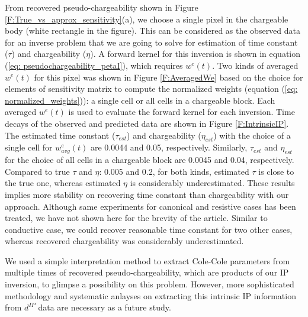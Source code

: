 \documentclass[a4paper, 11pt]{article}
\newcommand{\dip}{d^{IP}}
\begin{document}
From recovered pseudo-chargeability shown in Figure \ref{F:True_vs_approx_sensitivity}(a), we choose a single pixel in the chargeable body (white rectangle in the figure). 
This can be considered as the observed data for an inverse problem that we are going to solve for estimation of time constant ($\tau$) and chargeability ($\eta$). 
A forward kernel for this inversion is shown in equation (\ref{eq: pseudochargeability_petaI}), which requires $w^e(t)$. 
Two kinds of averaged $w^e(t)$ for this pixel was shown in Figure \ref{F:AveragedWe} based on the choice for elements of sensitivity matrix to compute the normalized weights (equation (\ref{eq: normalized_weights})): a single cell or all cells in a chargeable block. 
Each averaged $w^e(t)$ is used to evaluate the forward kernel for each inversion.
Time decays of the observed and predicted data are shown in Figure \ref{F:IntrinsicIP}.
The estimated time constant ($\tau_{est}$) and chargeability ($\eta_{est}$) with the choice of a single cell for $w^e_{avg}(t)$ are 0.0044 and 0.05, respectively. 
Similarly, $\tau_{est}$ and $\eta_{est}$ for the choice of all cells in a chargeable block are 0.0045 and 0.04, respectively. 
Compared to true $\tau$ and $\eta$: 0.005 and 0.2, for both kinds, estimated $\tau$ is close to the true one, whereas estimated $\eta$ is considerably underestimated. 
These results implies more stability on recovering time constant than chargeability with our approach. Although same experiments for canonical and resistive cases has been treated, we have not shown here for the brevity of the article.
Similar to conductive case, we could recover reasonable time constant for two other cases, whereas recovered chargeability was considerably underestimated. 

We used a simple interpretation method to extract Cole-Cole parameters from multiple times of recovered pseudo-chargeability, which are products of our IP inversion, to glimpse a possibility on this problem. 
However, more sophisticated methodology and systematic anlayses on extracting this intrinsic IP information from $\dip$ data are necessary as a future study. 
\end{document}
